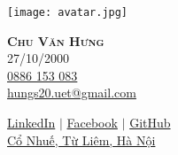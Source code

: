 \documentclass[letterpaper,11pt]{article}
\begin{document}

\begin{center}
    \noindent\begin{minipage}{0.2\textwidth}%
\texttt{[image: avatar.jpg]}
\end{minipage}%
\hfill%
\begin{minipage}{0.7\textwidth}\raggedright
\textbf{\Huge \scshape Chu Văn Hưng} \\ \vspace{10pt}
\small
    \faBirthdayCake \hspace{.5pt} 27/10/2000 \\ \vspace{3pt}
    \faMobile \hspace{.5pt} \href{tel:0886153083}{0886 153 083} \\ \vspace{3pt}
    \faAt \hspace{.5pt} \href{mailto:hungs20.uet@gmail.com}{hungs20.uet@gmail.com} \\ \vspace{3pt}
    
    \faLinkedinSquare \hspace{.5pt} \href{https://www.linkedin.com/in/hungs20}{LinkedIn}
    $|$
    \faFacebook \hspace{.5pt} \href{https://fb.com/it.hungcv}{Facebook}
    $|$
    \faGithub \hspace{.5pt} \href{https://github.com/hungs20}{GitHub}\\ \vspace{3pt}
    \faMapMarker \hspace{.5pt} \href{https://goo.gl/maps/9sLbJwDmryodERvY6}{Cổ Nhuế, Từ Liêm, Hà Nội}
\end{minipage}

\end{center}
\end{document}
